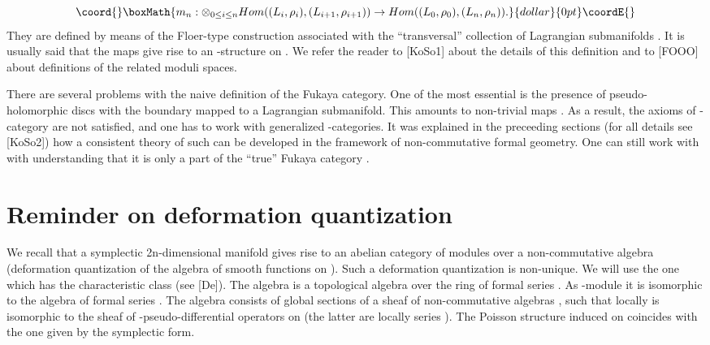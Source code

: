 \documentclass[a4paper,12pt]{article}
\begin{document}
$$\coord{}\boxMath{m_n:\otimes_{0\le i\le n}Hom((L_i,\rho_{i}),(L_{i+1},\rho_{i+1}))\to
Hom((L_0,\rho_0),(L_n,\rho_n)).}{dollar}{0pt}\coordE{}$$
They are defined by means of the Floer-type construction
associated with the ``transversal'' collection of 
Lagrangian submanifolds \coordHE{}. It is usually said that
the maps \coordHE{} give rise to an \myHighlight{$\A$}\coordHE{}-structure on \coordHE{}.
We refer the reader to [KoSo1] about the details of this definition
and to [FOOO] about definitions of the related moduli spaces.

There are several problems with the naive definition
of the Fukaya category. One of the most essential is the presence
of pseudo-holomorphic discs with the boundary mapped to a Lagrangian
submanifold. This amounts to non-trivial maps
\coordHE{}. As a result, the axioms of \myHighlight{$\A$}\coordHE{}-category
are not satisfied, and one has to work with generalized \myHighlight{$\A$}\coordHE{}-categories.
It was explained in the preceeding sections (for all details see  [KoSo2]) how a
consistent theory of such can be developed
in the framework of non-commutative formal geometry.
One can still work with \coordHE{} with understanding that it is
only a part of the ``true'' Fukaya category \coordHE{}.



\section{Reminder on deformation quantization}

We recall that a symplectic 
2n-dimensional manifold \coordHE{} gives rise to 
an abelian category \coordHE{} of modules over a non-commutative
algebra \coordHE{} (deformation quantization
of the algebra \coordHE{} of smooth functions on \coordHE{}).
Such a deformation quantization is non-unique. We will use the one 
which has the characteristic class \coordHE{} (see [De]).
The algebra \coordHE{} is a topological algebra over 
the ring of formal series \myHighlight{$\C[[t]]$}\coordHE{}. As \myHighlight{$\C[[t]]$}\coordHE{}-module it is isomorphic
to the algebra of formal series \coordHE{}.
The algebra \coordHE{} 
consists of global sections of a sheaf of non-commutative algebras
\coordHE{}, such that locally \coordHE{} is 
isomorphic to the sheaf of \coordHE{}-pseudo-differential
operators on \coordHE{} (the latter are locally series 
 \coordHE{}). The Poisson structure
 induced on \coordHE{} coincides with the 
 one given by the symplectic form.
\end{document}
